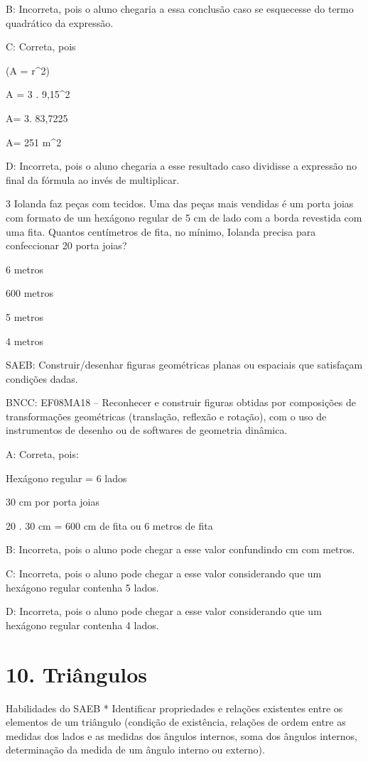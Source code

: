 {B: Incorreta, pois o aluno chegaria a essa conclusão caso se esquecesse
do termo quadrático da expressão.

C: Correta, pois

(A = \pi r^{2})

A = 3 . 9,15^2

A= 3. 83,7225

A= 251 m^2

D: Incorreta, pois o aluno chegaria a esse resultado caso dividisse a
expressão no final da fórmula ao invés de multiplicar.

\num{3} Iolanda faz peças com tecidos. Uma das peças mais vendidas é um porta
joias com formato de um hexágono regular de 5 cm de lado com a borda
revestida com uma fita. Quantos centímetros de fita, no mínimo, Iolanda
precisa para confeccionar 20 porta joias?
\item 6 metros
\item 600 metros
\item 5 metros
\item 4 metros

SAEB: Construir/desenhar figuras geométricas planas ou espaciais que
satisfaçam condições dadas.

BNCC: EF08MA18 -- Reconhecer e construir figuras obtidas por composições
de transformações geométricas (translação, reflexão e rotação), com o
uso de instrumentos de desenho ou de softwares de geometria dinâmica.

A: Correta, pois:

Hexágono regular = 6 lados

30 cm por porta joias

20 . 30 cm = 600 cm de fita ou 6 metros de fita

B: Incorreta, pois o aluno pode chegar a esse valor confundindo cm com
metros.

C: Incorreta, pois o aluno pode chegar a esse valor considerando que um
hexágono regular contenha 5 lados.

D: Incorreta, pois o aluno pode chegar a esse valor considerando que um
hexágono regular contenha 4 lados.


\section{10. Triângulos}

Habilidades do SAEB * Identificar propriedades e relações existentes
entre os elementos de um triângulo (condição de existência, relações de
ordem entre as medidas dos lados e as medidas dos ângulos internos, soma
dos ângulos internos, determinação da medida de um ângulo interno ou
externo).

}
